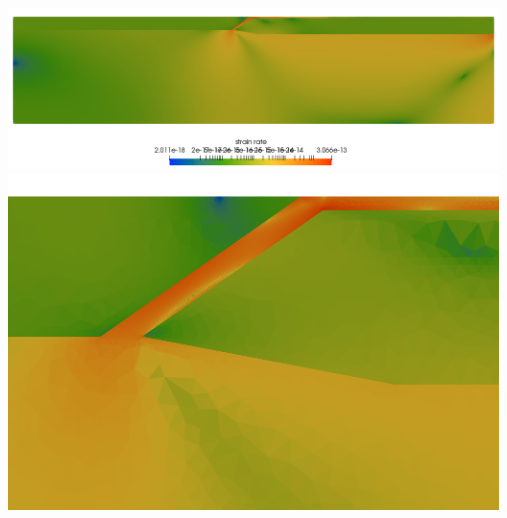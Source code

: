 \newpage
\begin{center}
\includegraphics[width=13cm]{python_codes/fieldstone_62/results/sr1}\\
\includegraphics[width=13cm]{python_codes/fieldstone_62/results/sr2}
\end{center}



